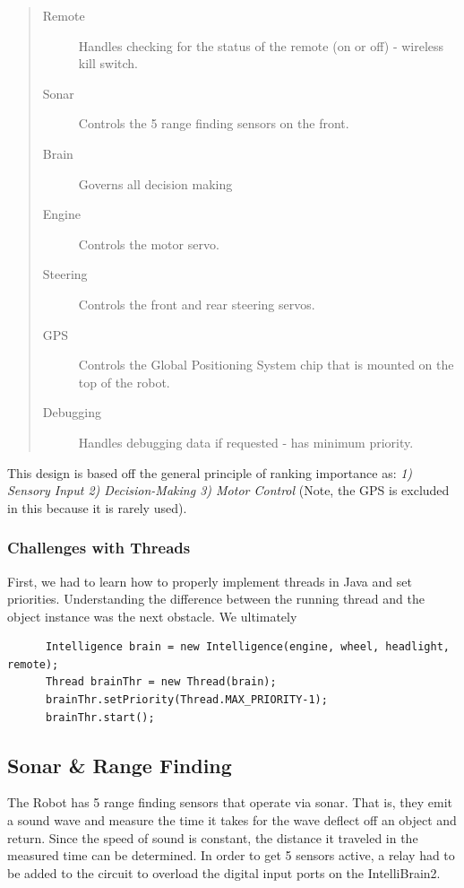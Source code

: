 \documentclass[12pt]{article}
\begin{document}
\begin{quote}
\begin{description}
\item[Remote] Handles checking for the status of the remote (on or off) - wireless kill switch.
\item[Sonar] Controls the 5 range finding sensors on the front.
\item[Brain] Governs all decision making
\item[Engine] Controls the motor servo.
\item[Steering] Controls the front and rear steering servos.
\item[GPS] Controls the Global Positioning System chip that is mounted on the top of the robot.
\item[Debugging] Handles debugging data if requested - has minimum priority.
\end{description}
\end{quote}

This design is based off the general principle of ranking importance as: \textit{1) Sensory Input 2) Decision-Making 3) Motor Control}  (Note, the GPS is excluded in this because it is rarely used).

\subsubsection*{Challenges with Threads}
First, we had to learn how to properly implement threads in Java and set priorities.  Understanding the difference between the running thread and the object instance was the next obstacle.  We ultimately 

\begin{verbatim}
      Intelligence brain = new Intelligence(engine, wheel, headlight, remote);
      Thread brainThr = new Thread(brain);
      brainThr.setPriority(Thread.MAX_PRIORITY-1);
      brainThr.start();
\end{verbatim}

\clearpage
\subsection{Sonar \& Range Finding}
The Robot has 5 range finding sensors that operate via sonar.  That is, they emit a sound wave and measure the time it takes for the wave deflect off an object and return.  Since the speed of sound is constant, the distance it traveled in the measured time can be determined.  In order to get 5 sensors active, a relay had to be added to the circuit to overload the digital input ports on the IntelliBrain2.
\end{document}
